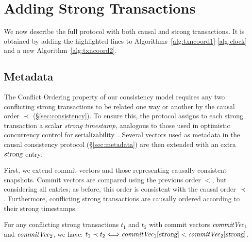 \section{Adding Strong Transactions}
\label{sec:redtransactions}

We now describe the full \System protocol with both causal and strong
transactions. It is obtained by adding the highlighted lines to
Algorithms~\ref{alg:txncoord1}-\ref{alg:clock} and a new
Algorithm~\ref{alg:txncoord2}.


\subsection{Metadata}


The Conflict Ordering property of our consistency model requires any two
conflicting strong transactions to be related one way or another by the causal
order $\prec$ (\S\ref{sec:consistency}). To ensure this, the protocol assigns to
each strong transaction a scalar {\em strong timestamp}, analogous to those used
in optimistic concurrency control for serializability~\cite{wv}.  Several
vectors used as metadata in the causal consistency protocol
(\S\ref{sec:metadata}) are then extended with an extra $\textsl{strong}$ entry.

First, we extend commit vectors and those representing causally consistent
snapshots. Commit vectors are compared using the previous order $<$, but
considering all entries; as before, this order is consistent with the causal
order $\prec$. Furthermore, conflicting strong transactions are causally ordered
according to their strong timestamps.
\begin{property}
  For any conflicting strong transactions $t_1$ and $t_2$ with commit vectors
  $\commitvector_1$ and $\commitvector_2$, we have:
  $t_1 \prec t_2 \Longleftrightarrow \commitvector_1[\red] < \commitvector_2[\red]$.
\end{property}

